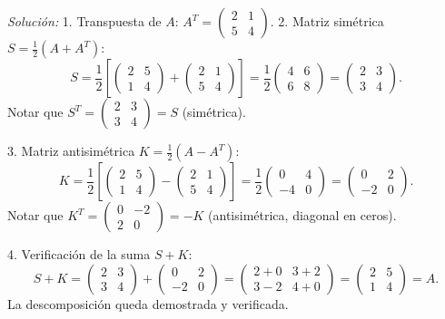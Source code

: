 \documentclass[11pt,letterpaper]{article}
\theoremstyle{definition}
\theoremstyle{plain}
\begin{document}
\emph{Solución:}
1. Transpuesta de $A$: $A^T = \begin{pmatrix} 2 & 1 \\ 5 & 4 \end{pmatrix}$.
2. Matriz simétrica $S = \frac{1}{2}(A + A^T)$:
\[
S = \frac{1}{2} \left[ \begin{pmatrix} 2 & 5 \\ 1 & 4 \end{pmatrix} + \begin{pmatrix} 2 & 1 \\ 5 & 4 \end{pmatrix} \right] = \frac{1}{2} \begin{pmatrix} 4 & 6 \\ 6 & 8 \end{pmatrix} = \begin{pmatrix} 2 & 3 \\ 3 & 4 \end{pmatrix}.
\]
Notar que $S^T = \begin{pmatrix} 2 & 3 \\ 3 & 4 \end{pmatrix} = S$ (simétrica).

3. Matriz antisimétrica $K = \frac{1}{2}(A - A^T)$:
\[
K = \frac{1}{2} \left[ \begin{pmatrix} 2 & 5 \\ 1 & 4 \end{pmatrix} - \begin{pmatrix} 2 & 1 \\ 5 & 4 \end{pmatrix} \right] = \frac{1}{2} \begin{pmatrix} 0 & 4 \\ -4 & 0 \end{pmatrix} = \begin{pmatrix} 0 & 2 \\ -2 & 0 \end{pmatrix}.
\]
Notar que $K^T = \begin{pmatrix} 0 & -2 \\ 2 & 0 \end{pmatrix} = -K$ (antisimétrica, diagonal en ceros).

4. Verificación de la suma $S + K$:
\[
S + K = \begin{pmatrix} 2 & 3 \\ 3 & 4 \end{pmatrix} + \begin{pmatrix} 0 & 2 \\ -2 & 0 \end{pmatrix} = \begin{pmatrix} 2+0 & 3+2 \\ 3-2 & 4+0 \end{pmatrix} = \begin{pmatrix} 2 & 5 \\ 1 & 4 \end{pmatrix} = A.
\]
La descomposición queda demostrada y verificada.
\end{document}
